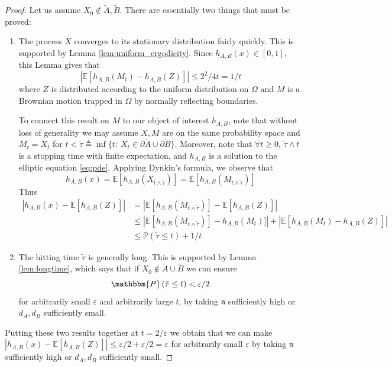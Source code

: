 \documentclass[english, aip, jcp, priprint, graphicx,floatfix]{revtex4-1}
\theoremstyle{plain}
\theoremstyle{definition}
\theoremstyle{plain}
\newcommand{\dimension}{{\mathfrak{n}}}
\begin{document}
\begin{proof}
Let us assume $X_0 \notin \tilde A,\tilde B$.  There are essentially two things that must be proved:
\begin{enumerate}
\item The process $X$ converges to its stationary distribution fairly quickly.  This is supported by Lemma \ref{lem:uniform_ergodicity}.  Since $h_{A,B}(x) \in [0,1]$, this Lemma gives that
%
\[
|\mathbb{E}[h_{A,B}(M_t)-h_{A,B}(Z)]| \leq 2^2/4t =1/t
\]
%
where $Z$ is distributed according to the uniform distribution on $\Omega$ and $M$ is a Brownian motion trapped in $\Omega$ by normally reflecting boundaries.  

To connect this result on $M$ to our object of interest $h_{A,B}$, note that without loss of generality we may assume $X,M$ are on the same probability space and $M_t=X_t$ for $t<\tilde\tau \triangleq \inf \{t:\ X_t \in \partial \dot A \cup \partial \dot B\}$.  Moreover, note that $\forall t \geq 0$, $\tilde\tau\wedge t$ is a stopping time with finite expectation, and $h_{A,B}$ is a solution to the elliptic equation \ref{eq:pde}. Applying Dynkin's formula, we observe that 
%
\[
h_{A,B}(x) = \mathbb{E} [h_{A,B}(X_{t\wedge\tilde\tau})] = \mathbb{E} [h_{A,B}(M_{t\wedge\tilde\tau})]
\]
%
Thus
\begin{align*}
|h_{A,B}(x) - \mathbb{E}[h_{A,B}(Z)]| &= |\mathbb{E} [h_{A,B}(M_{t\wedge\tilde\tau})] - \mathbb{E}[h_{A,B}(Z)]|\\
&\leq |\mathbb{E} [h_{A,B}(M_{t\wedge\tilde\tau})] - h_{A,B}(M_t)]| + |\mathbb{E} [h_{A,B}(M_{t}) - h_{A,B}(Z)]|\\
&\leq \mathbb{P}(\tilde \tau \leq t) + 1/t
\end{align*}
%

\item The hitting time $\tilde \tau$ is generally long.  This is supported by Lemma \ref{lem:longtime}, which says that if $X_0 \not\in\tilde{A} \cup \tilde{B}$ we can ensure
%
\[
\mathbbm{P} \left( \tilde{\tau} \leq t \right) < \varepsilon/2
\]
%
for arbitrarily small $\varepsilon$ and arbitrarily large $t$, by taking $\dimension$ sufficiently high or $d_A,d_B$ sufficiently small.
\end{enumerate}
Putting these two results together at $t=2/\varepsilon$ we obtain that we can make $|h_{A,B}(x) - \mathbb{E}[h_{A,B}(Z)]| \leq \varepsilon / 2 + \varepsilon/2 = \varepsilon$ for arbitrarily small $\varepsilon$ by taking $\dimension$ sufficiently high or $d_A,d_B$ sufficiently small.
\end{proof}
\end{document}
